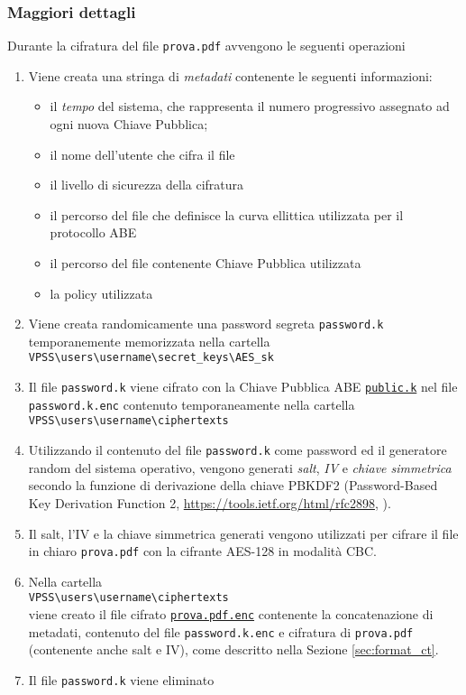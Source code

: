 \documentclass[a4paper,twoside,10pt,openany]{scrbook}
\begin{document}
\subsubsection*{Maggiori dettagli}
%
Durante la cifratura del file \texttt{prova.pdf} avvengono le seguenti operazioni
\begin{enumerate}
 \item Viene creata una stringa di \emph{metadati} contenente le seguenti informazioni:
 \begin{itemize}
  \item il \emph{tempo} del sistema, che rappresenta il numero progressivo assegnato ad ogni nuova Chiave Pubblica;
  \item il nome dell'utente che cifra il file
  \item il livello di sicurezza della cifratura
  \item il percorso del file che definisce la curva ellittica utilizzata per il protocollo ABE
  \item il percorso del file contenente Chiave Pubblica utilizzata
  \item la policy utilizzata
 \end{itemize}
 \item Viene creata randomicamente una password segreta \texttt{password.k} temporanemente memorizzata nella cartella\\
       \texttt{VPSS\textbackslash users\textbackslash username\textbackslash secret\_keys\textbackslash AES\_sk}
 \item Il file \texttt{password.k} viene cifrato con la Chiave Pubblica ABE \texttt{\hyperref[sec:format_pk]{public.k}} nel file \texttt{password.k.enc} contenuto temporaneamente nella cartella \\
 \texttt{VPSS\textbackslash users\textbackslash username\textbackslash ciphertexts}
 \item Utilizzando il contenuto del file  \texttt{password.k} come password ed il generatore random del sistema operativo,
       vengono generati \emph{salt}, \emph{IV} e \emph{chiave simmetrica} secondo la funzione di derivazione della chiave PBKDF2 (Password-Based Key Derivation Function 2,  \url{https://tools.ietf.org/html/rfc2898}, \cite{CLOUD:PBKDF2}).
 \item Il salt, l'IV e la chiave simmetrica generati vengono utilizzati per cifrare il file in chiaro \texttt{prova.pdf} con la cifrante AES-128 in modalità CBC.
 \item Nella cartella \\
        \texttt{VPSS\textbackslash users\textbackslash username\textbackslash ciphertexts}\\
       viene creato il file cifrato \texttt{\hyperref[sec:format_ct]{prova.pdf.enc}} contenente la concatenazione di metadati, contenuto del file \texttt{password.k.enc} e cifratura di \texttt{prova.pdf} (contenente anche salt e IV), come descritto nella Sezione \ref{sec:format_ct}.
 \item Il file \texttt{password.k} viene eliminato
\end{enumerate}
%
\end{document}
